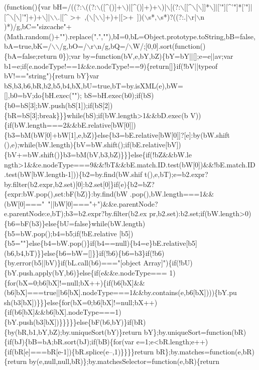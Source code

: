\begin{DoxyCode}
(\textcolor{keyword}{function}()\{var bH=/((?:\(\backslash\)((?:\(\backslash\)([^()]+\(\backslash\))|[^()]+)+\(\backslash\))|\(\backslash\)[(?:\(\backslash\)[[^\(\backslash\)[\(\backslash\)]]*\(\backslash\)]|[\textcolor{stringliteral}{'"][^'}\textcolor{stringliteral}{"]*['"}]|[^\(\backslash\)[\(\backslash\)]\textcolor{stringliteral}{'"]+)+\(\backslash\)]|\(\backslash\)\(\backslash\).|[^
       >+~,(\(\backslash\)[\(\backslash\)\(\backslash\)]+)+|[>+~])(\(\backslash\)s*,\(\backslash\)s*)?((?:.|\(\backslash\)r|\(\backslash\)n
      )*)/g,bC="sizcache"+(Math.random()+"").replace(".",""),bI=0,bL=Object.prototype.toString,bB=false,bA=true,bK=/\(\backslash\)\(\backslash\)/g,bO=/\(\backslash\)r\(\backslash\)n/g,bQ=/\(\backslash\)W/;[0,0].sort(function()\{bA=false;return
       0\});var by=function(bV,e,bY,bZ)\{bY=bY||[];e=e||av;var
       b1=e;if(e.nodeType!==1&&e.nodeType!==9)\{return[]\}if(!bV||typeof bV!=="string")\{return bY\}var
       bS,b3,b6,bR,b2,b5,b4,bX,bU=true,bT=by.isXML(e),bW=[],b0=bV;do\{bH.exec("");
      bS=bH.exec(b0);if(bS)\{b0=bS[3];bW.push(bS[1]);if(bS[2])\{bR=bS[3];break\}\}\}while(bS);if(bW.length>1&&bD.exec(b
      V))\{if(bW.length===2&&bE.relative[bW[0]])\{b3=bM(bW[0]+bW[1],e,bZ)\}else\{b3=bE.relative[bW[0]]?[e]:by(bW.shift
      (),e);while(bW.length)\{bV=bW.shift();if(bE.relative[bV])\{bV+=bW.shift()\}b3=bM(bV,b3,bZ)\}\}\}else\{if(!bZ&&bW.le
      ngth>1&&e.nodeType===9&&!bT&&bE.match.ID.test(bW[0])&&!bE.match.ID.test(bW[bW.length-1]))\{b2=by.find(bW.shif
      t(),e,bT);e=b2.expr?by.filter(b2.expr,b2.set)[0]:b2.set[0]\}if(e)\{b2=bZ?\{expr:bW.pop(),set:bF(bZ)\}:by.find(bW
      .pop(),bW.length===1&&(bW[0]==="~"||bW[0]==="+")&&e.parentNode?e.parentNode:e,bT);b3=b2.expr?by.filter(b2.ex
      pr,b2.set):b2.set;if(bW.length>0)\{b6=bF(b3)\}else\{bU=false\}while(bW.length)\{b5=bW.pop();b4=b5;if(!bE.relative
      [b5])\{b5=""\}else\{b4=bW.pop()\}if(b4==null)\{b4=e\}bE.relative[b5](b6,b4,bT)\}\}else\{b6=bW=[]\}\}if(!b6)\{b6=b3\}if(!b6)\{by.error(b5||bV)\}if(bL.call(b6)==="[object
       Array]")\{if(!bU)\{bY.push.apply(bY,b6)\}else\{if(e&&e.nodeType===
      1)\{for(bX=0;b6[bX]!=null;bX++)\{if(b6[bX]&&(b6[bX]===true||b6[bX].nodeType===1&&by.contains(e,b6[bX])))\{bY.pu
      sh(b3[bX])\}\}\}else\{for(bX=0;b6[bX]!=null;bX++)\{if(b6[bX]&&b6[bX].nodeType===1)\{bY.push(b3[bX])\}\}\}\}\}else\{bF(b6,bY)\}if(bR)\{by(bR,b1,bY,bZ);by.uniqueSort(bY)\}return
       bY\};by.uniqueSort=function(bR)\{if(bJ)\{bB=bA;bR.sort(bJ);if(bB)\{for(var e=1;e<bR.length;e++)\{if(bR[e]===bR[e-1])\{bR.splice(e--,1)\}\}\}\}return
       bR\};by.matches=function(e,bR)\{return by(e,null,null,bR)\};by.matchesSelector=function(e,bR)\{return
}
\end{DoxyCode}

